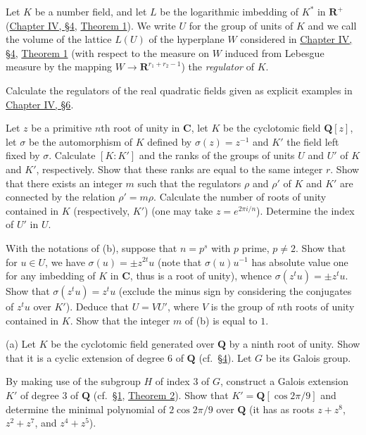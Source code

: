  Let $K$ be a number field, and let $L$ be the logarithmic
imbedding of $K^{*}$ in $\mathbf{R}^{+}$ (\hyperref[sec:4.4]{Chapter IV, §4}, \hyperref[thm:IV.4.1]{Theorem 1}). We
write $U$ for the group of units of $K$ and we call the volume of the
lattice $L(U)$ of the hyperplane $W$ considered in \hyperref[sec:4.4]{Chapter IV, §4},
\hyperref[thm:IV.4.1]{Theorem 1} (with respect to the measure on $W$ induced from Lebesgue measure
by the mapping $W\to\mathbf{R}^{r_{1}+r_{2}-1}$) the \emph{regulator} of
$K$.
\begin{alist}
\item Calculate the regulators of the real quadratic fields given as
explicit examples in \hyperref[sec:4.6]{Chapter IV, §6}.
\item Let $z$ be a primitive $n$th root of unity in $\mathbf{C}$, let $K$ be
the cyclotomic field $\mathbf{Q}[z]$, let $\sigma$ be the automorphism of
$K$ defined by $\sigma(z)=z^{-1}$ and $K'$ the field left fixed by
$\sigma$. Calculate $[K:K']$ and the ranks of the groups of units $U$ and
$U'$ of $K$ and $K'$, respectively. Show that these ranks are equal to the
same integer $r$. Show that there exists an integer $m$ such that the
regulators $\rho$ and $\rho'$ of $K$ and $K'$ are connected by the relation
$\rho'=m\rho$. Calculate the number of roots of unity contained in $K$
(respectively, $K'$) (one may take $z=e^{2\pi i/n}$). Determine the index of
$U'$ in $U$.
\item With the notations of (b), suppose that $n=p^{s}$ with $p$ prime,
$p\neq2$. Show that for $u\in U$, we have $\sigma(u)=\pm z^{2t}u$ (note that
$\sigma(u)u^{-1}$ has absolute value one for any imbedding of $K$ in
$\mathbf{C}$, thus is a root of unity), whence $\sigma(z^{t}u)=\pm z^{t}u$.
Show that $\sigma(z^{t}u)=z^{t}u$ (exclude the minus sign by considering
the conjugates of $z^{t}u$ over $K'$). Deduce that $U=VU'$, where $V$ is the
group of $n$th roots of unity contained in $K$. Show that the integer $m$
of (b) is equal to $1$.
\end{alist}

 (a) Let $K$ be the cyclotomic field generated over
$\mathbf{Q}$ by a ninth root of unity. Show that it is a cyclic extension of
degree $6$ of $\mathbf{Q}$ (cf.\ \hyperref[sec:6.4]{§4}). Let $G$ be its Galois group.
\begin{alist}
\item By making use of the subgroup $H$ of index $3$ of $G$, construct a
Galois extension $K'$ of degree $3$ of $\mathbf{Q}$ (cf.\ \hyperref[sec:6.1]{§1}, \hyperref[thm:VI.1.2]{Theorem 2}).
Show that $K'=\mathbf{Q}[\cos2\pi/9]$ and determine the minimal polynomial
of $2\cos2\pi/9$ over $\mathbf{Q}$ (it has as roots $z+z^{8}$, $z^{2}+z^{7}$,
and $z^{4}+z^{5}$).
\end{alist}

